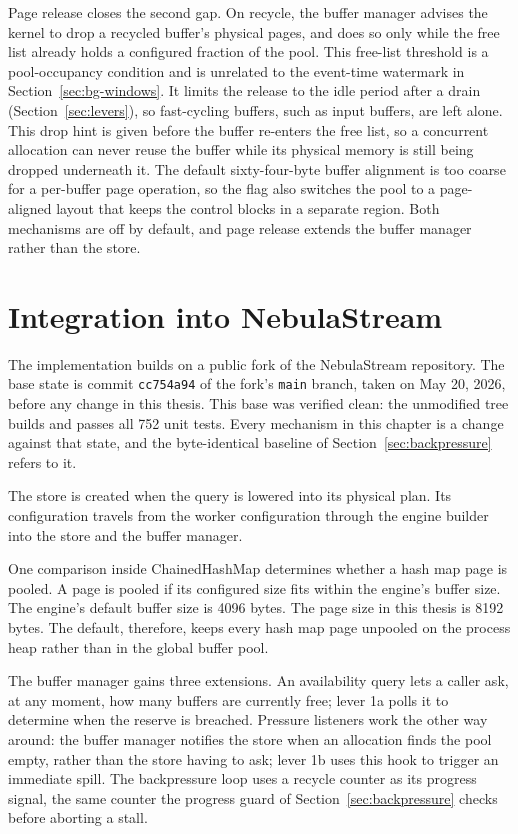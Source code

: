 Page release closes the second gap.
On recycle, the buffer manager advises the kernel to drop a recycled buffer's physical pages, and does so only while the free list already holds a configured fraction of the pool.
This free-list threshold is a pool-occupancy condition and is unrelated to the event-time watermark in Section~\ref{sec:bg-windows}.
It limits the release to the idle period after a drain (Section~\ref{sec:levers}), so fast-cycling buffers, such as input buffers, are left alone.
This drop hint is given before the buffer re-enters the free list, so a concurrent allocation can never reuse the buffer while its physical memory is still being dropped underneath it.
The default sixty-four-byte buffer alignment is too coarse for a per-buffer page operation, so the flag also switches the pool to a page-aligned layout that keeps the control blocks in a separate region.
Both mechanisms are off by default, and page release extends the buffer manager rather than the store.

\section{Integration into NebulaStream\label{sec:integration}}

The implementation builds on a public fork of the NebulaStream repository.
The base state is commit \texttt{cc754a94} of the fork's \texttt{main} branch, taken on May 20, 2026, before any change in this thesis.
This base was verified clean: the unmodified tree builds and passes all 752 unit tests.
Every mechanism in this chapter is a change against that state, and the byte-identical baseline of Section~\ref{sec:backpressure} refers to it.

The store is created when the query is lowered into its physical plan.
Its configuration travels from the worker configuration through the engine builder into the store and the buffer manager.

One comparison inside ChainedHashMap determines whether a hash map page is pooled.
A page is pooled if its configured size fits within the engine's buffer size.
The engine's default buffer size is 4096 bytes.
The page size in this thesis is 8192 bytes.
The default, therefore, keeps every hash map page unpooled on the process heap rather than in the global buffer pool.

The buffer manager gains three extensions.
An availability query lets a caller ask, at any moment, how many buffers are currently free; lever 1a polls it to determine when the reserve is breached.
Pressure listeners work the other way around: the buffer manager notifies the store when an allocation finds the pool empty, rather than the store having to ask; lever 1b uses this hook to trigger an immediate spill.
The backpressure loop uses a recycle counter as its progress signal, the same counter the progress guard of Section~\ref{sec:backpressure} checks before aborting a stall.

